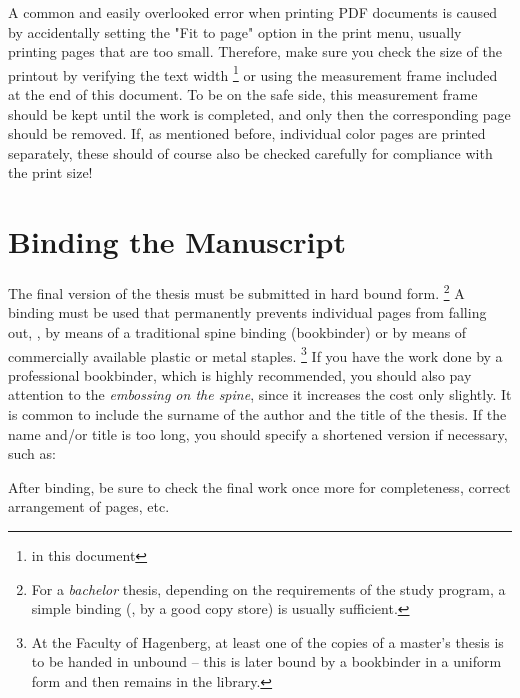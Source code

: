 A common and easily overlooked error when printing PDF documents is caused by 
accidentally setting the "Fit to page" option in the print menu, usually printing 
pages that are too small. Therefore, make sure you check the size of the printout 
by verifying the text width%
\footnote{\Convert[unit=mm]{\the\textwidth}	in this document} %
or using the measurement frame included at the end of this document.
To be on the safe side, this measurement frame should be kept until the work 
is completed, and only then the corresponding page should be removed.
If, as mentioned before, individual color pages are printed separately, these 
should of course also be checked carefully for compliance with the print size!


\section{Binding the Manuscript}

The final version of the thesis must be submitted in hard bound form.%
\footnote{For a \emph{bachelor} thesis, depending on the requirements of the study
program, a simple binding (\eg, by a good copy store) is usually sufficient.}
A binding must be used that permanently prevents individual pages from falling out,
\eg, by means of a traditional spine binding (bookbinder) or by means of 
commercially available plastic or metal staples.%
\footnote{At the Faculty of Hagenberg, at least one of the copies of a master's
thesis is to be handed in unbound -- this is later bound by a bookbinder in a
uniform form and then remains in the library.}
If you have the work done by a professional bookbinder, which is highly recommended,
you should also pay attention to the \emph{embossing on the spine}, since
it increases the cost only slightly. It is common to include the surname of the author
and the title of the thesis. If the name and/or title is too long, you should specify
a shortened version if necessary, such as:
%
\begin{center}
	\setlength{\fboxsep}{3mm}
\end{center}
%
After binding, be sure to check the final work once more for completeness, correct 
arrangement of pages, etc.



